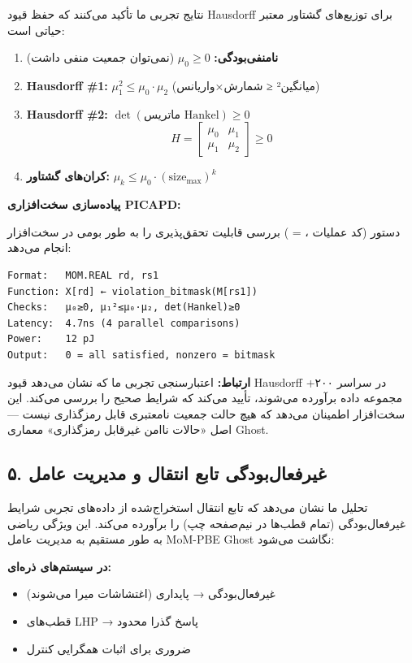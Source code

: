 \documentclass[12pt, a4paper]{article}
\begin{document}
نتایج تجربی ما تأکید می‌کنند که حفظ قیود Hausdorff برای توزیع‌های گشتاور معتبر حیاتی است:

\begin{enumerate}
\item \textbf{نامنفی‌بودگی:} $\mu_0 \geq 0$ (نمی‌توان جمعیت منفی داشت)
\item \textbf{Hausdorff \#1:} $\mu_1^2 \leq \mu_0 \cdot \mu_2$ (میانگین² ≤ شمارش×واریانس)
\item \textbf{Hausdorff \#2:} $\det(\text{ماتریس Hankel}) \geq 0$
\begin{equation}
H = \begin{bmatrix} \mu_0 & \mu_1 \\ \mu_1 & \mu_2 \end{bmatrix} \geq 0
\end{equation}
\item \textbf{کران‌های گشتاور:} $\mu_k \leq \mu_0 \cdot (\text{size}_{\max})^k$
\end{enumerate}

\textbf{پیاده‌سازی سخت‌افزاری PICAPD:}

دستور \textbf{} (کد عملیات ،  = ) بررسی قابلیت تحقق‌پذیری را به طور بومی در سخت‌افزار انجام می‌دهد:

\begin{verbatim}
Format:   MOM.REAL rd, rs1
Function: X[rd] ← violation_bitmask(M[rs1])
Checks:   μ₀≥0, μ₁²≤μ₀·μ₂, det(Hankel)≥0
Latency:  4.7ns (4 parallel comparisons)
Power:    12 pJ
Output:   0 = all satisfied, nonzero = bitmask
\end{verbatim}

\textbf{ارتباط:} اعتبارسنجی تجربی ما که نشان می‌دهد قیود Hausdorff در سراسر ۲۰۰+ مجموعه داده برآورده می‌شوند، تأیید می‌کند که  شرایط صحیح را بررسی می‌کند. این سخت‌افزار اطمینان می‌دهد که هیچ حالت جمعیت نامعتبری قابل رمزگذاری نیست — اصل «حالات ناامن غیرقابل رمزگذاری» معماری Ghost.

\subsection*{۵. غیرفعال‌بودگی تابع انتقال و مدیریت عامل}

تحلیل ما نشان می‌دهد که تابع انتقال استخراج‌شده از داده‌های تجربی شرایط غیرفعال‌بودگی (تمام قطب‌ها در نیم‌صفحه چپ) را برآورده می‌کند. این ویژگی ریاضی به طور مستقیم به مدیریت عامل MoM-PBE Ghost نگاشت می‌شود:

\textbf{در سیستم‌های ذره‌ای:}
\begin{itemize}
\item غیرفعال‌بودگی → پایداری (اغتشاشات میرا می‌شوند)
\item قطب‌های LHP → پاسخ گذرا محدود
\item ضروری برای اثبات همگرایی کنترل
\end{itemize}
\end{document}
